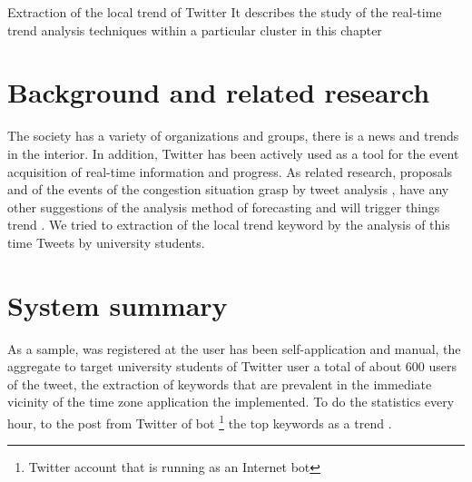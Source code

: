 \chapterhead
{Extraction of the local trend of Twitter}
{It describes the study of the real-time trend analysis techniques within a particular cluster in this chapter}


\section{Background and related research}
The society has a variety of organizations and groups, there is a news and trends in the interior. In addition, Twitter has been actively used as a tool for the event acquisition of real-time information and progress.
As related research, proposals and of the events of the congestion situation grasp by tweet analysis \cite{socialevent}, have any other suggestions of the analysis method of forecasting and will trigger things trend \cite{trendtrigger}.
We tried to extraction of the local trend keyword by the analysis of this time Tweets by university students.

\section{System summary}
As a sample, was registered at the user has been self-application and manual, the aggregate to target university students of Twitter user a total of about 600 users of the tweet, the extraction of keywords that are prevalent in the immediate vicinity of the time zone application the implemented. To do the statistics every hour, to the post from Twitter of bot \footnote{Twitter account that is running as an Internet bot} the top keywords as a trend \cite{tdu_trend}.

